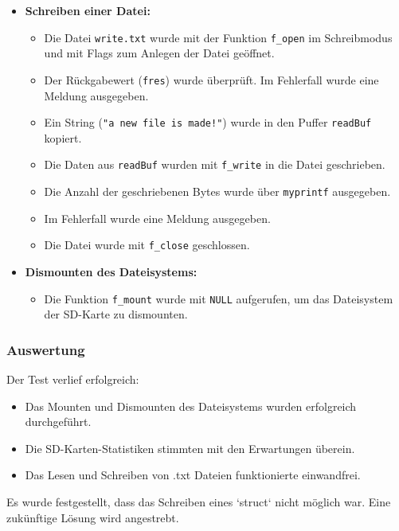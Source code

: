 \begin{itemize}
    \item \textbf{Schreiben einer Datei:}
    \begin{itemize}
        \item Die Datei \texttt{write.txt} wurde mit der Funktion \texttt{f\_open} im Schreibmodus und mit Flags zum Anlegen der Datei geöffnet.
        \item Der Rückgabewert (\texttt{fres}) wurde überprüft. Im Fehlerfall wurde eine Meldung ausgegeben.
        \item Ein String (\texttt{"a new file is made!"}) wurde in den Puffer \texttt{readBuf} kopiert.
        \item Die Daten aus \texttt{readBuf} wurden mit \texttt{f\_write} in die Datei geschrieben.
        \item Die Anzahl der geschriebenen Bytes wurde über \texttt{myprintf} ausgegeben.
        \item Im Fehlerfall wurde eine Meldung ausgegeben.
        \item Die Datei wurde mit \texttt{f\_close} geschlossen.
    \end{itemize}

    \item \textbf{Dismounten des Dateisystems:}
    \begin{itemize}
        \item Die Funktion \texttt{f\_mount} wurde mit \texttt{NULL} aufgerufen, um das Dateisystem der SD-Karte zu dismounten.
    \end{itemize}
\end{itemize}

\subsubsection{Auswertung}
Der Test verlief erfolgreich:

\begin{itemize}
    \item Das Mounten und Dismounten des Dateisystems wurden erfolgreich durchgeführt.
    \item Die SD-Karten-Statistiken stimmten mit den Erwartungen überein.
    \item Das Lesen und Schreiben von .txt Dateien funktionierte einwandfrei.
\end{itemize}

Es wurde festgestellt, dass das Schreiben eines `struct` nicht möglich war. Eine zukünftige Lösung wird angestrebt.
